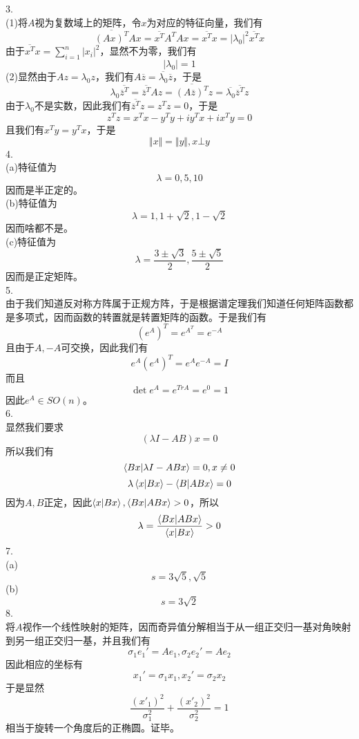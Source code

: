 \documentclass[utf8]{ctexart}
\begin{document}
3.\\
(1)将$A$视为复数域上的矩阵，令$x$为对应的特征向量，我们有
\[\overline{(Ax)^T}Ax=\overline{x^T}A^TAx=\overline{x^T}x=|\lambda_0|^2\overline{x^T}x\]
由于$\overline{x^T}x=\sum\limits_{i=1}^n|x_i|^2$，显然不为零，我们有
\[|\lambda_0|=1\]
(2)显然由于$Az=\lambda_0z$，我们有$A\overline{z}=\overline{\lambda_0}\overline{z}$，于是
\[\lambda_0\overline{\overline{z}^T}=\overline{\overline{z}^T}Az=\overline{(A\overline{z})^T}z=\overline{\lambda_0}\overline{\overline{z}^T}z\]
由于$\lambda_0$不是实数，因此我们有$\overline{\overline{z}^T}z=z^Tz=0$，于是
\[z^Tz=x^Tx-y^Ty+iy^Tx+ix^Ty=0\]
且我们有$x^Ty=y^Tx$，于是
\[\Vert x\Vert=\Vert y\Vert,x\bot y\]
4.\\
(a)特征值为
\[\lambda=0,5,10\]
因而是半正定的。\\
(b)特征值为
\[\lambda=1,1+\sqrt{2},1-\sqrt{2}\]
因而啥都不是。\\
(c)特征值为
\[\lambda=\frac{3\pm\sqrt{3}}{2},\frac{5\pm\sqrt{5}}{2}\]
因而是正定矩阵。\\
5.\\
由于我们知道反对称方阵属于正规方阵，于是根据谱定理我们知道任何矩阵函数都是多项式，因而函数的转置就是转置矩阵的函数。于是我们有
\[(e^A)^T=e^{A^T}=e^{-A}\]
且由于$A,-A$可交换，因此我们有
\[e^{A}(e^A)^T=e^Ae^{-A}=I\]
而且
\[\det e^A=e^{TrA}=e^0=1\]
因此$e^A\in SO(n)$。\\
6.\\
显然我们要求
\[(\lambda I-AB)x=0\]
所以我们有
\[\braket{Bx|\lambda I-ABx}=0,x\neq0\]
\[\lambda\braket{x|Bx}-\braket{B|ABx}=0\]
因为$A,B$正定，因此$\braket{x|Bx},\braket{Bx|ABx}>0$，所以
\[\lambda=\frac{\braket{Bx|ABx}}{\braket{x|Bx}}>0\]
7.\\
(a)\[s=3\sqrt{5},\sqrt{5}\]
(b)\[s=3\sqrt{2}\]
8.\\
将$A$视作一个线性映射的矩阵，因而奇异值分解相当于从一组正交归一基对角映射到另一组正交归一基，并且我们有
\[\sigma_1e_1'=Ae_1,\sigma_2e_2'=Ae_2\]
因此相应的坐标有
\[x_1'=\sigma_1x_1,x_2'=\sigma_2x_2\]
于是显然
\[\frac{(x'_1)^2}{\sigma_1^2}+\frac{(x'_2)^2}{\sigma_2^2}=1\]
相当于旋转一个角度后的正椭圆。证毕。
\end{document}
